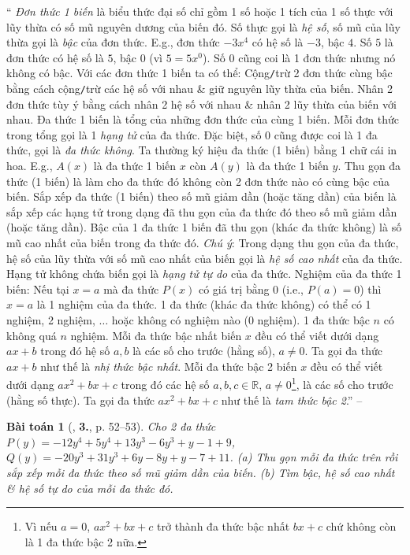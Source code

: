 \documentclass{article}
\numberwithin{equation}{section}
\newtheorem{baitoan}{Bài toán}
\begin{document}
`` \textit{Đơn thức 1 biến} là biểu thức đại số chỉ gồm 1 số hoặc 1 tích của 1 số thực với lũy thừa có số mũ nguyên dương của biến đó. Số thực gọi là \textit{hệ số}, số mũ của lũy thừa gọi là \textit{bậc} của đơn thức. E.g., đơn thức $-3x^4$ có hệ số là $-3$, bậc $4$. Số $5$ là đơn thức có hệ số là $5$, bậc $0$ (vì $5 = 5x^0$). Số $0$ cũng coi là 1 đơn thức nhưng nó không có bậc.  Với các đơn thức 1 biến ta có thể: Cộng\texttt{/}trừ 2 đơn thức cùng bậc bằng cách cộng\texttt{/}trừ các hệ số với nhau \& giữ nguyên lũy thừa của biến. Nhân 2 đơn thức tùy ý bằng cách nhân 2 hệ số với nhau \& nhân 2 lũy thừa của biến với nhau.  Đa thức 1 biến là tổng của những đơn thức của cùng 1 biến. Mỗi đơn thức trong tổng gọi là 1 \textit{hạng tử} của đa thức. Đặc biệt, số 0 cũng được coi là 1 đa thức, gọi là \textit{đa thức không}. Ta thường ký hiệu đa thức (1 biến) bằng 1 chữ cái in hoa. E.g., $A(x)$ là đa thức 1 biến $x$ còn $A(y)$ là đa thức 1 biến $y$.  Thu gọn đa thức (1 biến) là làm cho đa thức đó không còn 2 đơn thức nào có cùng bậc của biến. Sắp xếp đa thức (1 biến) theo số mũ giảm dần (hoặc tăng dần) của biến là sắp xếp các hạng tử trong dạng đã thu gọn của đa thức đó theo số mũ giảm dần (hoặc tăng dần).  Bậc của 1 đa thức 1 biến đã thu gọn (khác đa thức không) là số mũ cao nhất của biến trong đa thức đó. \textit{Chú ý}: Trong dạng thu gọn của đa thức, hệ số của lũy thừa với số mũ cao nhất của biến gọi là \textit{hệ số cao nhất} của đa thức. Hạng tử không chứa biến gọi là \textit{hạng tử tự do} của đa thức.  Nghiệm của đa thức 1 biến: Nếu tại $x = a$ mà đa thức $P(x)$ có giá trị bằng $0$ (i.e., $P(a) = 0$) thì $x = a$ là 1 nghiệm của đa thức.  1 đa thức (khác đa thức không) có thể có 1 nghiệm, 2 nghiệm, $\ldots$ hoặc không có nghiệm nào (0 nghiệm). 1 đa thức bậc $n$ có không quá $n$ nghiệm.  Mỗi đa thức bậc nhất biến $x$ đều có thể viết dưới dạng $ax + b$ trong đó hệ số $a,b$ là các số cho trước (hằng số), $a\ne0$. Ta gọi đa thức $ax + b$ như thế là \textit{nhị thức bậc nhất}. Mỗi đa thức bậc 2 biến $x$ đều có thể viết dưới dạng $ax^2 + bx + c$ trong đó các hệ số $a,b,c\in\mathbb{R}$, $a\ne 0$\footnote{Vì nếu $a = 0$, $ax^2 + bx + c$ trở thành đa thức bậc nhất $bx + c$ chứ không còn là 1 đa thức bậc 2 nữa.}, là các số cho trước (hằng số thực). Ta gọi đa thức $ax^2 + bx + c$ như thế là \textit{tam thức bậc 2}.'' -- \cite[Chap. III, \S2, p. 39]{Tuyen_Toan_7}

\begin{baitoan}[\cite{SGK_Toan_7_Canh_Dieu_tap_2}, \textbf{3.}, p. 52--53]
	Cho 2 đa thức $P(y) = -12y^4 + 5y^4 + 13y^3 - 6y^3 + y -1 + 9$, $Q(y) = -20y^3 + 31y^3 + 6y - 8y + y - 7 + 11$. (a) Thu gọn mỗi đa thức trên rồi sắp xếp mỗi đa thức theo số mũ giảm dần của biến. (b) Tìm bậc, hệ số cao nhất \& hệ số tự do của mỗi đa thức đó.
\end{baitoan}
\end{document}
